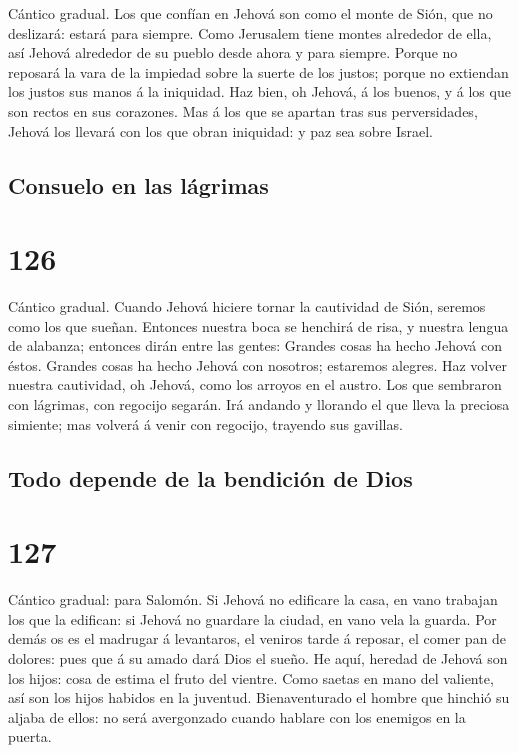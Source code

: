  Cántico gradual. Los que confían en Jehová son como el
monte de Sión, que no deslizará: estará para siempre. 
Como Jerusalem tiene montes alrededor de ella, así Jehová alrededor de
su pueblo desde ahora y para siempre.  Porque no reposará
la vara de la impiedad sobre la suerte de los justos; porque no
extiendan los justos sus manos á la iniquidad.  Haz bien,
oh Jehová, á los buenos, y á los que son rectos en sus corazones.
 Mas á los que se apartan tras sus perversidades, Jehová
los llevará con los que obran iniquidad: y paz sea sobre Israel.

\hypertarget{consuelo-en-las-luxe1grimas}{%
\subsection{Consuelo en las
lágrimas}\label{consuelo-en-las-luxe1grimas}}

\hypertarget{section-125}{%
\section{126}\label{section-125}}

 Cántico gradual. Cuando Jehová hiciere tornar la
cautividad de Sión, seremos como los que sueñan.  Entonces
nuestra boca se henchirá de risa, y nuestra lengua de alabanza; entonces
dirán entre las gentes: Grandes cosas ha hecho Jehová con éstos.
 Grandes cosas ha hecho Jehová con nosotros; estaremos
alegres.  Haz volver nuestra cautividad, oh Jehová, como
los arroyos en el austro.  Los que sembraron con lágrimas,
con regocijo segarán.  Irá andando y llorando el que lleva
la preciosa simiente; mas volverá á venir con regocijo, trayendo sus
gavillas.

\hypertarget{todo-depende-de-la-bendiciuxf3n-de-dios}{%
\subsection{Todo depende de la bendición de
Dios}\label{todo-depende-de-la-bendiciuxf3n-de-dios}}

\hypertarget{section-126}{%
\section{127}\label{section-126}}

 Cántico gradual: para Salomón. Si Jehová no edificare la
casa, en vano trabajan los que la edifican: si Jehová no guardare la
ciudad, en vano vela la guarda.  Por demás os es el
madrugar á levantaros, el veniros tarde á reposar, el comer pan de
dolores: pues que á su amado dará Dios el sueño.  He aquí,
heredad de Jehová son los hijos: cosa de estima el fruto del vientre.
 Como saetas en mano del valiente, así son los hijos
habidos en la juventud.  Bienaventurado el hombre que
hinchió su aljaba de ellos: no será avergonzado cuando hablare con los
enemigos en la puerta.

